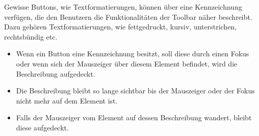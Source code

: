 Gewisse Buttons, wie Textformatierungen, können über eine Kennzeichnung verfügen, die den Benutzern die
Funktionalitäten der Toolbar näher beschreibt. Dazu gehören Textformatierungen, wie fettgedruckt, kursiv, 
unterstrichen, rechtsbündig etc. 

\begin{itemize}
	\item Wenn ein Button eine Kennzeichnung besitzt, soll diese durch einen Fokus oder wenn sich der Mauszeiger
		über diesem Element befindet, wird die Beschreibung aufgedeckt.
	\item Die Beschreibung bleibt so lange sichtbar bis der Mauszeiger oder der Fokus nicht mehr auf dem Element 
		ist.
	\item Falls der Mauszeiger vom Element auf dessen Beschreibung wandert, bleibt diese aufgedeckt. 
\end{itemize}

\newpage
